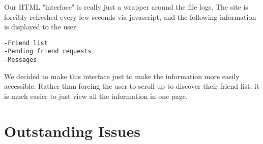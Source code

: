 \documentclass[11pt]{article}
\begin{document}
Our HTML "interface" is really just a wrapper around the file logs. The site is forcibly refreshed every few seconds via javascript, and the following information is displayed to the user:

\begin{verbatim}
-Friend list
-Pending friend requests
-Messages
\end{verbatim}

We decided to make this interface just to make the information more easily accessible. Rather than forcing the user to scroll up to discover their friend list, it is much easier to just view all the information in one page. 

\section{Outstanding Issues}
\end{document}
